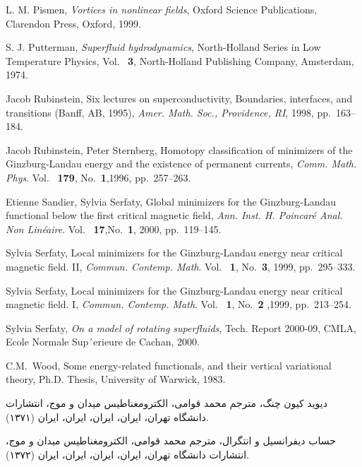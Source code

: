 \begin{thebibliography}{99}
L. M. Pismen, {\it Vortices in nonlinear fields}, Oxford Science Publications, Clarendon
Press, Oxford, 1999.

S. J. Putterman, {\it Superfluid hydrodynamics}, North-Holland Series in Low Temperature
Physics, Vol.~ {\bf 3}, North-Holland Publishing Company, Amsterdam, 1974.

Jacob Rubinstein, Six lectures on superconductivity, Boundaries, interfaces, and transitions
(Banff, AB, 1995), {\it Amer. Math. Soc., Providence, RI}, 1998, pp.~163–184.

Jacob Rubinstein, Peter Sternberg, Homotopy classification of minimizers of the
Ginzburg-Landau energy and the existence of permanent currents, {\it Comm. Math. Phys}.
Vol.~ {\bf 179}, No.~{\bf 1},1996, pp.~257–263.

Etienne Sandier, Sylvia Serfaty, Global minimizers for the Ginzburg-Landau functional
below the first critical magnetic field, {\it Ann. Inst. H. Poincar\'e Anal. Non Lin\'eaire}. Vol.~ {\bf 17},No.~{\bf 1},
2000, pp.~119–145.

Sylvia Serfaty, Local minimizers for the Ginzburg-Landau energy near critical magnetic
field. II, {\it Commun. Contemp. Math}.  Vol.~ {\bf 1}, No.~{\bf 3}, 1999, pp.~295–333.

Sylvia Serfaty, Local minimizers for the Ginzburg-Landau energy near critical magnetic
field. I, {\it Commun. Contemp. Math}. Vol.~ {\bf 1}, No.~{\bf 2} ,1999, pp.~213–254.

Sylvia Serfaty, {\it On a model of rotating superfluids}, Tech. Report 2000-09, CMLA, Ecole
Normale Sup´erieure de Cachan, 2000.

 C.M.~Wood, Some energy-related functionals, and their 
vertical variational theory, Ph.D. Thesis, University of
Warwick, 1983.

 \RTL
\setpersianfont
\footnotesize 

دیوید کیون چنگ، مترجم محمد قوامی، الکترومغناطیس میدان و موج، انتشارات دانشگاه تهران، ایران، ایران، ایران، ایران (۱۳۷۱).

حساب دیفرانسیل و انتگرال، مترجم محمد قوامی، الکترومغناطیس میدان و موج، انتشارات دانشگاه تهران، ایران، ایران، ایران، ایران (۱۳۷۲).

\end{thebibliography}







